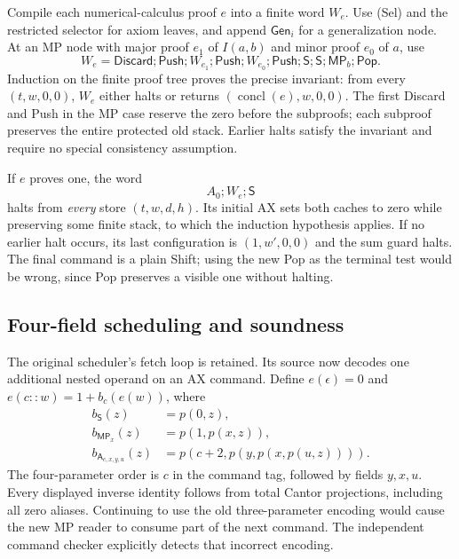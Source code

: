Compile each numerical-calculus proof $e$ into a finite word $W_e$.
Use (Sel) and the restricted selector for axiom leaves, and append
$\mathsf{Gen}_i$ for a generalization node. At an MP node with major
proof $e_1$ of $I(a,b)$ and minor proof $e_0$ of $a$, use
\[
 W_e=\mathsf{Discard};\mathsf{Push};W_{e_1};\mathsf{Push};
       W_{e_0};\mathsf{Push};\mathsf S;\mathsf S;
                              \mathsf{MP}_b;\mathsf{Pop}.
\]
Induction on the finite proof tree proves the precise invariant:
from every $(t,w,0,0)$, $W_e$ either halts or returns
$(\operatorname{concl}(e),w,0,0)$. The first Discard and Push in the
MP case reserve the zero before the subproofs; each subproof preserves
the entire protected old stack. Earlier halts satisfy the invariant
and require no special consistency assumption.

If $e$ proves one, the word
\[
                             A_0;W_e;\mathsf S             \tag{H}
\]
halts from \emph{every} store $(t,w,d,h)$. Its initial AX sets both
caches to zero while preserving some finite stack, to which the induction
hypothesis applies. If no earlier halt occurs, its last configuration is
$(1,w',0,0)$ and the sum guard halts. The final command is a plain Shift;
using the new Pop as the terminal test would be wrong, since Pop preserves
a visible one without halting.

\subsection{Four-field scheduling and soundness}

The original scheduler's fetch loop is retained. Its source now decodes
one additional nested operand on an AX command. Define $e(\epsilon)=0$
and $e(c::w)=1+b_c(e(w))$, where
\[
\begin{aligned}
 b_{\mathsf S}(z)&=p(0,z),\\
 b_{\mathsf{MP}_x}(z)&=p(1,p(x,z)),\\
 b_{\mathsf A_{c,x,y,u}}(z)&=p(c+2,p(y,p(x,p(u,z)))).
\end{aligned}                                               \tag{Enc}
\]
The four-parameter order is $c$ in the command tag, followed by fields
$y,x,u$. Every displayed inverse identity follows from total Cantor
projections, including all zero aliases. Continuing to use the old
three-parameter encoding would cause the new MP reader to consume part
of the next command. The independent command checker explicitly detects
that incorrect encoding.

